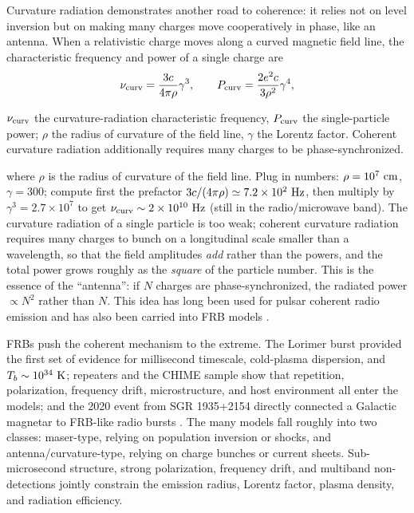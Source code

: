 Curvature radiation demonstrates another road to coherence: it relies not on level inversion but on making many charges move cooperatively in phase, like an antenna. When a relativistic charge moves along a curved magnetic field line, the characteristic frequency and power of a single charge are
\begin{equation}
  \nu_{\rm curv}=\frac{3c}{4\pi\rho}\gamma^3,
  \qquad
  P_{\rm curv}=\frac{2e^2c}{3\rho^2}\gamma^4 ,
  \label{eq:e16-curvature}
\end{equation}
\begin{formulaexplain}
\(\nu_{\rm curv}\) the curvature-radiation characteristic frequency, \(P_{\rm curv}\) the single-particle power; \(\rho\) the radius of curvature of the field line, \(\gamma\) the Lorentz factor. Coherent curvature radiation additionally requires many charges to be phase-synchronized.
\end{formulaexplain}
where \(\rho\) is the radius of curvature of the field line. Plug in numbers: \(\rho=10^7~{\rm cm}\), \(\gamma=300\); compute first the prefactor \(3c/(4\pi\rho)\simeq7.2\times10^2~{\rm Hz}\), then multiply by \(\gamma^3=2.7\times10^7\) to get \(\nu_{\rm curv}\sim2\times10^{10}~{\rm Hz}\) (still in the radio/microwave band). The curvature radiation of a single particle is too weak; coherent curvature radiation requires many charges to bunch on a longitudinal scale smaller than a wavelength, so that the field amplitudes \emph{add} rather than the powers, and the total power grows roughly as the \emph{square} of the particle number. This is the essence of the ``antenna'': if \(N\) charges are phase-synchronized, the radiated power \(\propto N^2\) rather than \(N\). This idea has long been used for pulsar coherent radio emission and has also been carried into FRB models \citep{1977ApJ...212..800C,2018MNRAS.477.2470L}.

FRBs push the coherent mechanism to the extreme. The Lorimer burst provided the first set of evidence for millisecond timescale, cold-plasma dispersion, and \(T_b\sim10^{34}~{\rm K}\); repeaters and the CHIME sample show that repetition, polarization, frequency drift, microstructure, and host environment all enter the models; and the 2020 event from SGR 1935+2154 directly connected a Galactic magnetar to FRB-like radio bursts \citep{2007Sci...318..777L,2019A&ARv..27....4P,2022A&ARv..30....2P,2020Natur.587...54C,2020Natur.587...59B}. The many models fall roughly into two classes: maser-type, relying on population inversion or shocks, and antenna/curvature-type, relying on charge bunches or current sheets. Sub-microsecond structure, strong polarization, frequency drift, and multiband non-detections jointly constrain the emission radius, Lorentz factor, plasma density, and radiation efficiency.

